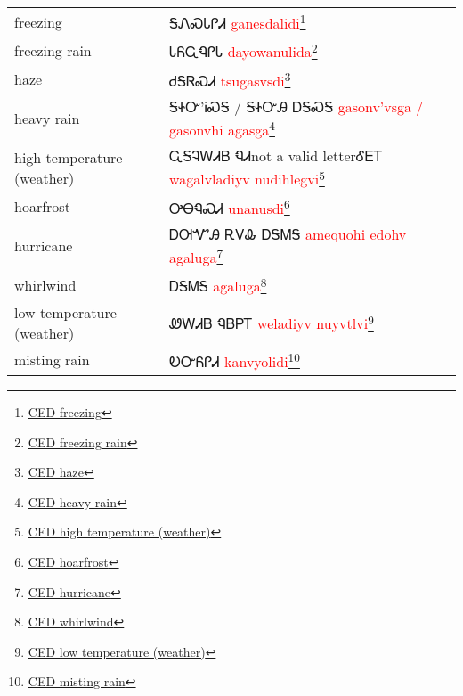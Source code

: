 \begin{multicols}
\begin{minipage}{\linewidth}
\begin{tabular}{p{5cm} p{9cm}}
freezing & ᎦᏁᏍᏓᎵᏗ 
 \newline \textcolor{red}{ganesdalidi}\footnote{\href{https://cherokeedictionary.net/share/101962}{CED freezing}}\\
freezing rain & ᏓᏲᏩᏄᎵᏓ 
 \newline \textcolor{red}{dayowanulida}\footnote{\href{https://cherokeedictionary.net/share/101963}{CED freezing rain}}\\
haze & ᏧᎦᏒᏍᏗ 
 \newline \textcolor{red}{tsugasvsdi}\footnote{\href{https://cherokeedictionary.net/share/101964}{CED haze}}\\
heavy rain & ᎦᏐᏅ'ᎥᏍᎦ / ᎦᏐᏅᎯ  ᎠᎦᏍᎦ 
 \newline \textcolor{red}{gasonv'vsga / gasonvhi  agasga}\footnote{\href{https://cherokeedictionary.net/share/101965}{CED heavy rain}}\\
high temperature (weather) & ᏩᎦᎸᎳᏗᏴ ᏄᏗnot a valid letterᎴᎬᎢ 
 \newline \textcolor{red}{wagalvladiyv nudihlegvi}\footnote{\href{https://cherokeedictionary.net/share/101966}{CED high temperature (weather)}}\\
hoarfrost & ᎤᎾᏄᏍᏗ 
 \newline \textcolor{red}{unanusdi}\footnote{\href{https://cherokeedictionary.net/share/101967}{CED hoarfrost}}\\
hurricane & ᎠᎺᏉᎯ  ᎡᏙᎲ ᎠᎦᎷᎦ 
 \newline \textcolor{red}{amequohi  edohv agaluga}\footnote{\href{https://cherokeedictionary.net/share/101968}{CED hurricane}}\\
whirlwind & ᎠᎦᎷᎦ 
 \newline \textcolor{red}{agaluga}\footnote{\href{https://cherokeedictionary.net/share/101969}{CED whirlwind}}\\
low temperature (weather) & ᏪᎳᏗᏴ ᏄᏴᏢᎢ 
 \newline \textcolor{red}{weladiyv nuyvtlvi}\footnote{\href{https://cherokeedictionary.net/share/101970}{CED low temperature (weather)}}\\
misting rain & ᎧᏅᏲᎵᏗ 
 \newline \textcolor{red}{kanvyolidi}\footnote{\href{https://cherokeedictionary.net/share/101971}{CED misting rain}}\\
\end{tabular}
\end{minipage}


\end{multicols}
